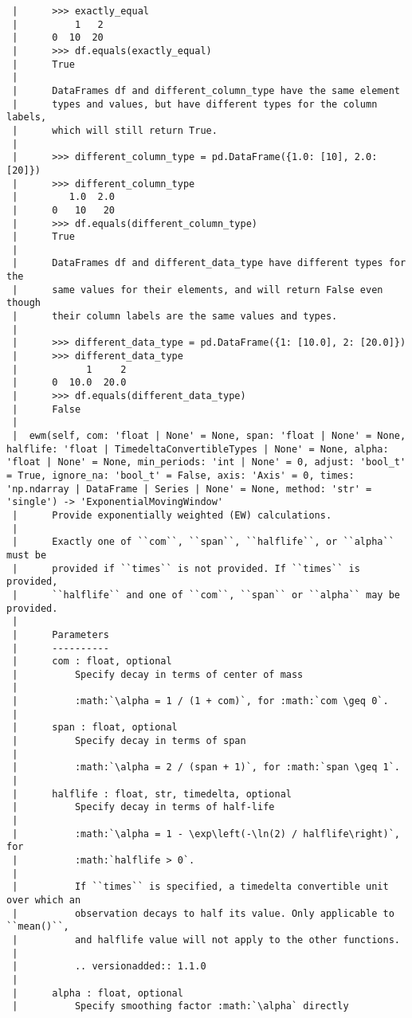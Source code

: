\documentclass[
  letterpaper,
  DIV=11,
  numbers=noendperiod]{scrreprt}
\begin{document}
\begin{verbatim}
 |      >>> exactly_equal
 |          1   2
 |      0  10  20
 |      >>> df.equals(exactly_equal)
 |      True
 |      
 |      DataFrames df and different_column_type have the same element
 |      types and values, but have different types for the column labels,
 |      which will still return True.
 |      
 |      >>> different_column_type = pd.DataFrame({1.0: [10], 2.0: [20]})
 |      >>> different_column_type
 |         1.0  2.0
 |      0   10   20
 |      >>> df.equals(different_column_type)
 |      True
 |      
 |      DataFrames df and different_data_type have different types for the
 |      same values for their elements, and will return False even though
 |      their column labels are the same values and types.
 |      
 |      >>> different_data_type = pd.DataFrame({1: [10.0], 2: [20.0]})
 |      >>> different_data_type
 |            1     2
 |      0  10.0  20.0
 |      >>> df.equals(different_data_type)
 |      False
 |  
 |  ewm(self, com: 'float | None' = None, span: 'float | None' = None, halflife: 'float | TimedeltaConvertibleTypes | None' = None, alpha: 'float | None' = None, min_periods: 'int | None' = 0, adjust: 'bool_t' = True, ignore_na: 'bool_t' = False, axis: 'Axis' = 0, times: 'np.ndarray | DataFrame | Series | None' = None, method: 'str' = 'single') -> 'ExponentialMovingWindow'
 |      Provide exponentially weighted (EW) calculations.
 |      
 |      Exactly one of ``com``, ``span``, ``halflife``, or ``alpha`` must be
 |      provided if ``times`` is not provided. If ``times`` is provided,
 |      ``halflife`` and one of ``com``, ``span`` or ``alpha`` may be provided.
 |      
 |      Parameters
 |      ----------
 |      com : float, optional
 |          Specify decay in terms of center of mass
 |      
 |          :math:`\alpha = 1 / (1 + com)`, for :math:`com \geq 0`.
 |      
 |      span : float, optional
 |          Specify decay in terms of span
 |      
 |          :math:`\alpha = 2 / (span + 1)`, for :math:`span \geq 1`.
 |      
 |      halflife : float, str, timedelta, optional
 |          Specify decay in terms of half-life
 |      
 |          :math:`\alpha = 1 - \exp\left(-\ln(2) / halflife\right)`, for
 |          :math:`halflife > 0`.
 |      
 |          If ``times`` is specified, a timedelta convertible unit over which an
 |          observation decays to half its value. Only applicable to ``mean()``,
 |          and halflife value will not apply to the other functions.
 |      
 |          .. versionadded:: 1.1.0
 |      
 |      alpha : float, optional
 |          Specify smoothing factor :math:`\alpha` directly

\end{verbatim}
\end{document}
